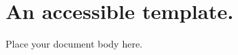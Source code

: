 \documentclass[12pt,a4paper]{article}
\begin{document}
\section{An accessible template.}

  Place your document body here.
\end{document}
